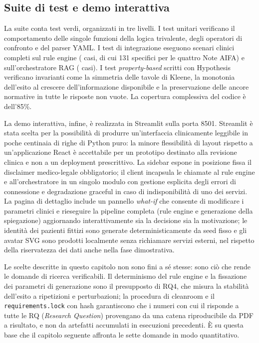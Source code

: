 \subsection{Suite di test e demo interattiva}
\label{subsec:test-demo-impl}

La suite conta \testcountall{} test verdi, organizzati in tre livelli. I test
unitari verificano il comportamento delle singole funzioni della logica
trivalente, degli operatori di confronto e del parser YAML. I test di
integrazione eseguono scenari clinici completi sul rule engine
(\testcountengine{} casi, di cui 131 specifici per le quattro Note AIFA) e
sull'orchestratore RAG (\testcountorch{} casi). I test \emph{property-based}
scritti con Hypothesis verificano invarianti come la
simmetria delle tavole di Kleene, la monotonia dell'esito al crescere
dell'informazione disponibile e la preservazione delle ancore normative in
tutte le risposte non vuote. La copertura complessiva del codice è
dell'85\%.

La demo interattiva, infine, è realizzata in Streamlit sulla porta 8501.
Streamlit è stata scelta per la possibilità di produrre un'interfaccia
clinicamente leggibile in poche centinaia di righe di Python puro: la minore
flessibilità di layout rispetto a un'applicazione React è accettabile per un
prototipo destinato alla revisione clinica e non a un deployment prescrittivo.
La sidebar espone in posizione fissa il disclaimer medico-legale obbligatorio;
il client incapsula le chiamate al rule engine e all'orchestratore in un
singolo modulo con gestione esplicita degli errori di connessione e
degradazione graceful in caso di indisponibilità di uno dei servizi. La
pagina di dettaglio include un pannello \emph{what-if} che consente di
modificare i parametri clinici e rieseguire la pipeline completa (rule engine
e generazione della spiegazione) aggiornando interattivamente sia la decisione
sia la motivazione; le identità dei pazienti fittizi sono generate
deterministicamente da seed fisso e gli avatar SVG sono prodotti localmente
senza richiamare servizi esterni, nel rispetto della riservatezza dei dati
anche nella fase dimostrativa.

Le scelte descritte in questo capitolo non sono fini a sé stesse: sono ciò che
rende le domande di ricerca verificabili. Il determinismo del rule engine e la
fissazione dei parametri di generazione sono il presupposto di RQ4, che misura
la stabilità dell'esito a ripetizioni e perturbazioni; la procedura di cleanroom
e il \texttt{requirements.lock} con hash garantiscono che i numeri con cui il
 risponde a tutte le RQ (\emph{Research Question}) provengano da una catena
riproducibile da PDF a risultato, e non da artefatti accumulati in esecuzioni
precedenti. È su questa base che il capitolo seguente affronta le sette domande
in modo quantitativo.
